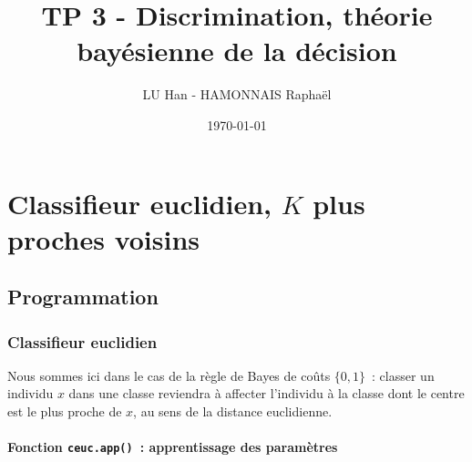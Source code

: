 \documentclass[a4paper,10pt]{report}
\title{TP 3 - Discrimination, théorie bayésienne de la décision}
\author{LU Han - HAMONNAIS Raphaël}
\date{\today}
\begin{document}
\renewcommand{\labelitemi}{\large\textcolor{tatoebagreen}{\fg}}
\groovypdtitre
\restoregeometry %


\tableofcontents











\chapter{Classifieur euclidien, $K$ plus proches voisins}


\section{Programmation}

\subsection{Classifieur euclidien}

Nous sommes ici dans le cas de la règle de Bayes de coûts $\{0,1\}$~: classer un individu $x$ dans une classe reviendra à affecter l'individu à la classe dont le centre est le plus proche de $x$, au sens de la distance euclidienne.

\subsubsection{Fonction \texttt{ceuc.app()}~: apprentissage des paramètres}
\end{document}
